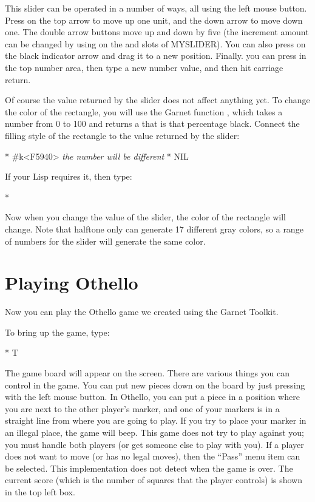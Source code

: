 This slider can be operated in a number of ways, all using the left mouse
button.  Press on the top arrow to move up one unit, and the down arrow to
move down one.  The double arrow buttons move up and down by five (the
increment amount can be changed by using  on the
 and  slots of MYSLIDER).  You can
also press on
the black indicator arrow and drag it to a new position.  Finally. you can
press in the top number area, then type a new number value, and then hit
carriage return.

Of course the value returned by the slider does not affect anything yet.
To change the color of the rectangle, you will use the Garnet function
, which takes a number from 0 to 100 and returns a
 that is that percentage black.  Connect the filling
style of the rectangle to the value returned by the slider:

\begin{programexample}
* 
\#k<F5940>   {\it the number will be different}
* 
NIL
\end{programexample}
If your Lisp requires it, then type:
\begin{programexample}
* 
\end{programexample}

Now when you change the value of the slider, the color of the rectangle
will change.  Note that halftone only can generate 17 different gray
colors, so a range of numbers for the slider will generate the same color.

\chapter{Playing Othello}
\label{Othello}

Now you can play the Othello game we created using the Garnet Toolkit.

To bring up the game, type:
\begin{programexample}
* 
T
\end{programexample}
The game board will appear on the
screen.  There are various things you can control in the game.  You can put
new pieces down on the board by just pressing with the left mouse button.
In Othello, you can put a piece in a position where you are next to the
other player's marker, and one of your markers is in a straight line from
where you are going to play.
If you try to place your marker in an illegal place, the
game will beep.  This game does not try to play against you; you must
handle both players (or get someone else to play with you).
If a player does not want to move (or has no legal moves), then the
``Pass'' menu item can be selected.  This implementation does not detect
when the game is over.  The current score (which is the number of squares
that the player controls) is shown in the top left box.

